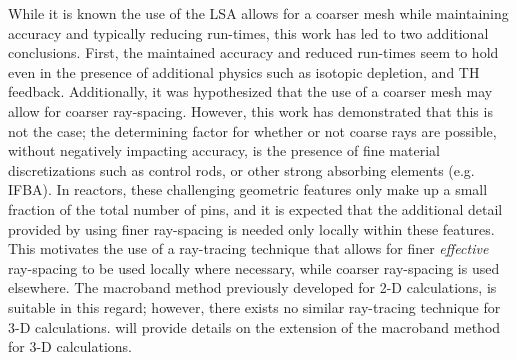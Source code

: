{{    While it is known the use of the \ac{LSA} allows for a coarser mesh while maintaining accuracy and typically reducing run-times, this work has led to two additional conclusions.
    First, the maintained accuracy and reduced run-times seem to hold even in the presence of additional physics such as isotopic depletion, and \ac{TH} feedback.
    Additionally, it was hypothesized that the use of a coarser mesh may allow for coarser ray-spacing.
    However, this work has demonstrated that this is not the case; the determining factor for whether or not coarse rays are possible, without negatively impacting accuracy, is the presence of fine material discretizations such as control rods, or other strong absorbing elements (e.g. \ac{IFBA}).
    In reactors, these challenging geometric features only make up a small fraction of the total number of pins, and it is expected that the additional detail provided by using finer ray-spacing is needed only locally within these features.
    This motivates the use of a ray-tracing technique that allows for finer \emph{effective} ray-spacing to be used locally where necessary, while coarser ray-spacing is used elsewhere.
    The macroband method previously developed for 2-D calculations, is suitable in this regard; however, there exists no similar ray-tracing technique for 3-D calculations.
     will provide details on the extension of the macroband method for 3-D calculations.
  }

  \printbibliography
}
